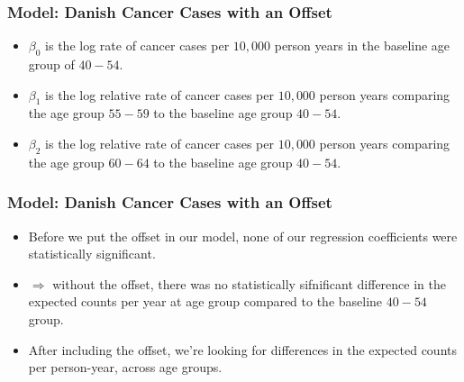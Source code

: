 \documentclass[10pt,xcolor={svgnames},t]{beamer}
\begin{document}
%
%
\begin{frame}
	\frametitle{Model: Danish Cancer Cases with an Offset}
	
	\begin{itemize}
		\item $\beta_0$ is the log rate of cancer cases per $10,000$ person years in the baseline age group of $40-54$.
		\bigskip
		\item $\beta_1$ is the log relative rate of cancer cases per $10,000$ person years comparing the age group $55-59$ to the baseline age group $40-54$.
		\bigskip
		\item $\beta_2$ is the log relative rate of cancer cases per $10,000$ person years comparing the age group $60-64$ to the baseline age group $40-54$.
	\end{itemize}
	
	
\end{frame}
%
%
\begin{frame}
	\frametitle{Model: Danish Cancer Cases with an Offset}
	
	\begin{itemize}
		\item Before we put the offset in our model, none of our regression coefficients were statistically significant.
		\smallskip
		\item[] $\Rightarrow$ without the offset, there was no statistically sifnificant difference in the expected counts per year at age group compared to the baseline $40-54$ group.
		\bigskip
		\item After including the offset, we're looking for differences in the expected counts per person-year, across age groups. 
	\end{itemize}
	
	
\end{frame}
%
%
\end{document}
